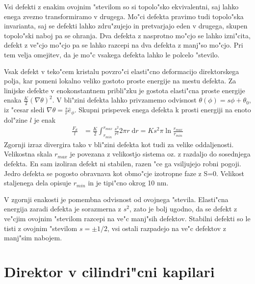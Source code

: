 \documentclass[12pt,twoside,openright,final]{report}
\newcommand{\dd}{\ensuremath{\;\mathrm{d}}}
\begin{document}
Vsi defekti z enakim ovojnim "stevilom so si topolo"sko ekvivalentni, saj lahko enega zvezno transformiramo v drugega. 
Mo"ci defekta pravimo tudi topolo"ska invarianta, saj se defekti lahko zdru"zujejo in pretvarjajo eden v drugega, skupen topolo"ski naboj pa se ohranja. 
Dva defekta z nasprotno mo"cjo se lahko izni"cita, defekt z ve"cjo mo"cjo pa se lahko razcepi na dva defekta z manj"so mo"cjo. 
Pri tem velja omejitev, da je mo"c vsakega defekta lahko le polcelo "stevilo. 

Vsak defekt v teko"cem kristalu povzro"ci elasti"cno deformacijo direktorskega polja, kar pomeni lokalno veliko gostoto proste energije na mestu defekta. 
Za linijske defekte v enokonstantnem pribli"zku je gostota elasti"cna proste energije enaka $\frac{K}{2}(\nabla \theta)^2$. 
V bli"zini defekta lahko privzamemo odvisnost $\theta(\phi) = s \phi + \theta_0$, iz "cesar sledi $\nabla\theta = \frac{s}{r}\hat e_\phi$. 
Skupni prispevek enega defekta k prosti energiji na enoto dol"zine $l$ je enak \cite{degennes}
\begin{align}
 \frac{F_d}{l} &= \frac{K}{2} \int_{r_{min}}^{r_{max}} \frac{s^2}{r^2} 2\pi r \dd r = K s^2 \pi \ln{\frac{r_{max}}{r_{min}}}
\end{align}
Zgornji izraz divergira tako v bli"zini defekta kot tudi za velike oddaljenosti. 
Velikostna skala $r_{max}$ je povezana z velikostjo sistema oz. z razdaljo do sosednjega defekta. 
En sam izoliran defekt ni stabilen, razen "ce ga vsiljujejo robni pogoji. 
Jedro defekta se pogosto obravnava kot obmo"cje izotropne faze z S=0.
Velikost staljenega dela opisuje $r_{min}$ in je tipi"cno okrog 10 nm. 

V zgornji enakosti je pomembna odvisnost od ovojnega "stevila. 
Elasti"cna energija zaradi defekta je sorazmerna z $s^2$, zato je bolj ugodno, da se defekt z ve"cjim ovojnim "stevilom razcepi na ve"c manj"sih defektov. 
Stabilni defekti so le tisti z ovojnim "stevilom $s=\pm1/2$, vsi ostali razpadejo na ve"c defektov z manj"sim nabojem. 

\section{Direktor v cilindri"cni kapilari}
\end{document}
